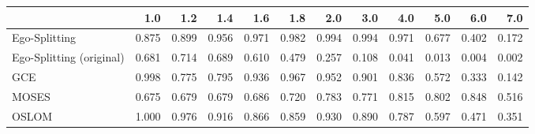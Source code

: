 \begin{tabular}{lrrrrrrrrrrr}
\toprule
{} &   1.0 &   1.2 &   1.4 &   1.6 &   1.8 &   2.0 &   3.0 &   4.0 &   5.0 &   6.0 &   7.0 \\
\midrule
Ego-Splitting            & 0.875 & 0.899 & 0.956 & 0.971 & 0.982 & 0.994 & 0.994 & 0.971 & 0.677 & 0.402 & 0.172 \\
Ego-Splitting (original) & 0.681 & 0.714 & 0.689 & 0.610 & 0.479 & 0.257 & 0.108 & 0.041 & 0.013 & 0.004 & 0.002 \\
GCE                      & 0.998 & 0.775 & 0.795 & 0.936 & 0.967 & 0.952 & 0.901 & 0.836 & 0.572 & 0.333 & 0.142 \\
MOSES                    & 0.675 & 0.679 & 0.679 & 0.686 & 0.720 & 0.783 & 0.771 & 0.815 & 0.802 & 0.848 & 0.516 \\
OSLOM                    & 1.000 & 0.976 & 0.916 & 0.866 & 0.859 & 0.930 & 0.890 & 0.787 & 0.597 & 0.471 & 0.351 \\
\bottomrule
\end{tabular}
